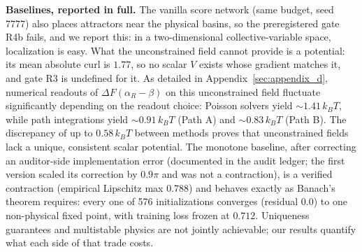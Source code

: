 \documentclass{article}
\begin{document}
\textbf{Baselines, reported in full.} The vanilla score network (same
budget, seed 7777) also places attractors near the physical basins, so the
preregistered gate R4b fails, and we report this: in a two-dimensional
collective-variable space, localization is easy. What the unconstrained
field cannot provide is a potential: its mean absolute curl is $1.77$, so no
scalar $V$ exists whose gradient matches it, and gate R3 is undefined for
it. As detailed in Appendix~\ref{sec:appendix_d}, numerical readouts of 
$\Delta F(\alpha_R - \beta)$ on this unconstrained field fluctuate significantly 
depending on the readout choice: Poisson solvers yield $\sim 1.41\,k_B T$, 
while path integrations yield $\sim 0.91\,k_B T$ (Path A) and $\sim 0.83\,k_B T$ (Path B). 
The discrepancy of up to $0.58\,k_B T$ between methods proves that unconstrained 
fields lack a unique, consistent scalar potential. The monotone baseline, after correcting an auditor-side implementation
error (documented in the audit ledger; the first version scaled its
correction by $0.9\pi$ and was not a contraction), is a verified contraction
(empirical Lipschitz max $0.788$) and behaves exactly as Banach's theorem
requires: every one of 576 initializations converges (residual
$0.0$) to one non-physical fixed point, with training loss frozen at
$0.712$. Uniqueness guarantees and multistable physics are not jointly
achievable; our results quantify what each side of that trade costs.








\newpage
\appendix

\end{document}
